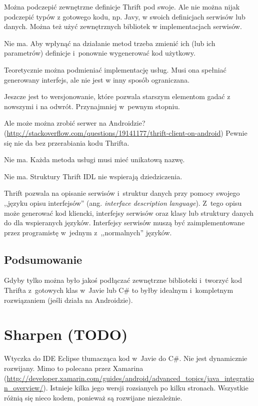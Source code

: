 \begin{description}
Można podczepić zewnętrzne definicje Thrift pod swoje. Ale nie można nijak podczepić typów z gotowego kodu, np. Javy, w swoich definicjach serwisów lub danych. Można też użyć zewnętrznych bibliotek w implementacjach serwisów.

Nie ma. Aby wpłynąć na działanie metod trzeba zmienić ich (lub ich parametrów) definicje i~ponownie wygenerować kod użytkowy.

Teoretycznie można podmieniać implementację usług. Musi ona spełniać generowany interfejs, ale nie jest w inny sposób ograniczana.

Jeszcze jest to wersjonowanie, które pozwala starszym elementom gadać z nowszymi i na odwrót. Przynajmniej w~pewnym stopniu. 

Ale może można zrobić serwer na Androidzie? (\url{http://stackoverflow.com/questions/19141177/thrift-client-on-android}) Pewnie się nie da bez przerabiania kodu Thrifta.

Nie ma. Każda metoda usługi musi mieć unikatową nazwę\cite{thrift-features}.

Nie ma. Struktury Thrift IDL nie wspierają dziedziczenia\cite{thrift-features}.

Thrift pozwala na opisanie serwisów i~struktur danych przy pomocy swojego ,,języku opisu interfejsów'' (ang. \emph{interface description language}).
Z~tego opisu może generować kod kliencki, interfejsy serwisów oraz klasy lub struktury danych do dla wspieranych języków. \cite{thrift-features}
Interfejsy serwisów muszą być zaimplementowane przez programistę w~jednym z~,,normalnych'' języków.

\end{description}


\subsection{Podsumowanie}
Gdyby tylko można było jakoś podłączać zewnętrzne biblioteki i~tworzyć kod Thrifta z~gotowych klas w~Javie lub C\# to byłby idealnym i~kompletnym rozwiązaniem (jeśli działa na Androidzie).



\section{Sharpen (TODO)}
Wtyczka do IDE Eclipse tłumacząca kod w~Javie do C\#.
Nie jest dynamicznie rozwijany. Mimo to polecana przez Xamarina (\url{http://developer.xamarin.com/guides/android/advanced_topics/java_integration_overview/}).
Istnieje kilka jego wersji rozsianych po kilku stronach. Wszystkie różnią się nieco kodem, ponieważ są rozwijane niezależnie.

